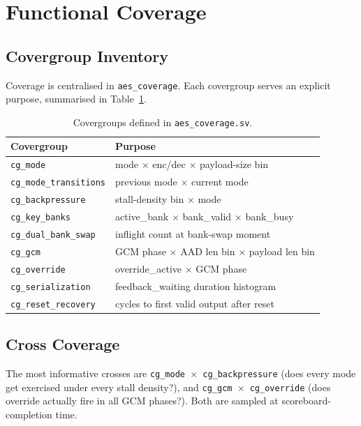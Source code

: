 \documentclass[conference,10pt,a4paper]{IEEEtran}
\begin{document}
\section{Functional Coverage}
\label{sec:coverage}

\subsection{Covergroup Inventory}
Coverage is centralised in \texttt{aes\_coverage}.  Each covergroup
serves an explicit purpose, summarised in Table~\ref{tab:cov}.

\begin{table}[t]
\caption{Covergroups defined in \texttt{aes\_coverage.sv}.}
\label{tab:cov}
\centering
\small
\begin{tabular}{p{} p{}}
\toprule
\textbf{Covergroup} & \textbf{Purpose} \\
\midrule
\texttt{cg\_mode} & mode $\times$ enc/dec $\times$ payload-size bin \\
\texttt{cg\_mode\_transitions} & previous mode $\times$ current mode \\
\texttt{cg\_backpressure} & stall-density bin $\times$ mode \\
\texttt{cg\_key\_banks} & active\_bank $\times$ bank\_valid $\times$ bank\_busy \\
\texttt{cg\_dual\_bank\_swap} & inflight count at bank-swap moment \\
\texttt{cg\_gcm} & GCM phase $\times$ AAD len bin $\times$ payload len bin \\
\texttt{cg\_override} & override\_active $\times$ GCM phase \\
\texttt{cg\_serialization} & feedback\_waiting duration histogram \\
\texttt{cg\_reset\_recovery} & cycles to first valid output after reset \\
\bottomrule
\end{tabular}
\end{table}

\subsection{Cross Coverage}
The most informative crosses are
\texttt{cg\_mode $\times$ cg\_backpressure} (does every mode get
exercised under every stall density?), and
\texttt{cg\_gcm $\times$ cg\_override} (does override actually fire in
all GCM phases?).  Both are sampled at scoreboard-completion time.
\end{document}
